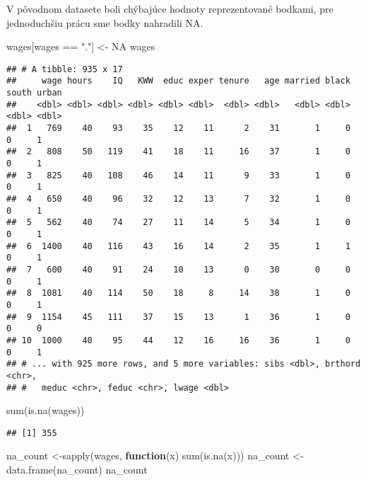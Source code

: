 \documentclass[
]{article}
\newenvironment{Shaded}{\begin{snugshade}}{\end{snugshade}}
\newcommand{\ConstantTok}[1]{\textcolor[rgb]{0.00,0.00,0.00}{#1}}
\newcommand{\ControlFlowTok}[1]{\textcolor[rgb]{0.13,0.29,0.53}{\textbf{#1}}}
\newcommand{\FunctionTok}[1]{\textcolor[rgb]{0.00,0.00,0.00}{#1}}
\newcommand{\NormalTok}[1]{#1}
\newcommand{\OtherTok}[1]{\textcolor[rgb]{0.56,0.35,0.01}{#1}}
\newcommand{\SpecialCharTok}[1]{\textcolor[rgb]{0.00,0.00,0.00}{#1}}
\newcommand{\StringTok}[1]{\textcolor[rgb]{0.31,0.60,0.02}{#1}}
\begin{document}
V pôvodnom datasete boli chýbajúce hodnoty reprezentované bodkami, pre
jednoduchšiu prácu sme bodky nahradili NA.

\begin{Shaded}
\begin{Highlighting}[]
\NormalTok{wages[wages }\SpecialCharTok{==} \StringTok{"."}\NormalTok{] }\OtherTok{\textless{}{-}} \ConstantTok{NA}
\NormalTok{wages}
\end{Highlighting}
\end{Shaded}

\begin{verbatim}
## # A tibble: 935 x 17
##     wage hours    IQ   KWW  educ exper tenure   age married black south urban
##    <dbl> <dbl> <dbl> <dbl> <dbl> <dbl>  <dbl> <dbl>   <dbl> <dbl> <dbl> <dbl>
##  1   769    40    93    35    12    11      2    31       1     0     0     1
##  2   808    50   119    41    18    11     16    37       1     0     0     1
##  3   825    40   108    46    14    11      9    33       1     0     0     1
##  4   650    40    96    32    12    13      7    32       1     0     0     1
##  5   562    40    74    27    11    14      5    34       1     0     0     1
##  6  1400    40   116    43    16    14      2    35       1     1     0     1
##  7   600    40    91    24    10    13      0    30       0     0     0     1
##  8  1081    40   114    50    18     8     14    38       1     0     0     1
##  9  1154    45   111    37    15    13      1    36       1     0     0     0
## 10  1000    40    95    44    12    16     16    36       1     0     0     1
## # ... with 925 more rows, and 5 more variables: sibs <dbl>, brthord <chr>,
## #   meduc <chr>, feduc <chr>, lwage <dbl>
\end{verbatim}

\begin{Shaded}
\begin{Highlighting}[]
\FunctionTok{sum}\NormalTok{(}\FunctionTok{is.na}\NormalTok{(wages))}
\end{Highlighting}
\end{Shaded}

\begin{verbatim}
## [1] 355
\end{verbatim}

\begin{Shaded}
\begin{Highlighting}[]
\NormalTok{na\_count }\OtherTok{\textless{}{-}}\FunctionTok{sapply}\NormalTok{(wages, }\ControlFlowTok{function}\NormalTok{(x) }\FunctionTok{sum}\NormalTok{(}\FunctionTok{is.na}\NormalTok{(x)))}
\NormalTok{na\_count }\OtherTok{\textless{}{-}} \FunctionTok{data.frame}\NormalTok{(na\_count)}
\NormalTok{na\_count}
\end{Highlighting}
\end{Shaded}
\end{document}
